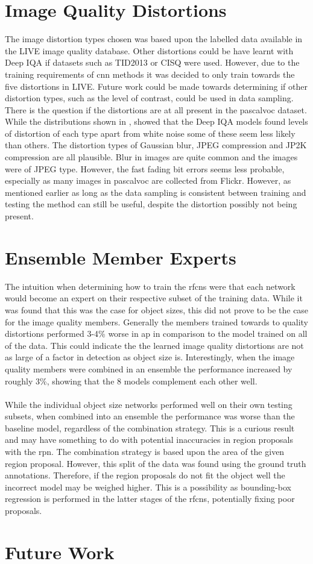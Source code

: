 \section{Image Quality Distortions}
The image distortion types chosen was based upon the labelled data available in the LIVE image quality database. Other distortions could be have learnt with Deep IQA if datasets such as TID2013 \cite{tid2013} or CISQ \cite{cisq} were used. However, due to the training requirements of \gls{cnn} methods it was decided to only train towards the five distortions in LIVE. Future work could be made towards determining if other distortion types, such as the level of contrast, could be used in data sampling. There is the question if the distortions are at all present in the \gls{pascalvoc} dataset. While the distributions shown in , showed that the Deep IQA models found levels of distortion of each type apart from white noise some of these seem less likely than others. The distortion types of Gaussian blur, JPEG compression and JP2K compression are all plausible. Blur in images are quite common and the images were of JPEG type. However, the fast fading bit errors seems less probable, especially as many images in \gls{pascalvoc} are collected from Flickr. However, as mentioned earlier as long as the data sampling is consistent between training and testing the method can still be useful, despite the distortion possibly not being present.

\section{Ensemble Member Experts}
The intuition when determining how to train the \glspl{rfcn} were that each network would become an expert on their respective subset of the training data. While it was found that this was the case for object sizes, this did not prove to be the case for the image quality members. Generally the members trained towards to quality distortions performed 3-4\% worse in \gls{ap} in comparison to the model trained on all of the data. This could indicate the the learned image quality distortions are not as large of a factor in detection as object size is. Interestingly, when the image quality members were combined in an ensemble the performance increased by roughly 3\%, showing that the 8 models complement each other well. 
\\\\
While the individual object size networks performed well on their own testing subsets, when combined into an ensemble the performance was worse than the baseline model, regardless of the combination strategy. This is a curious result and may have something to do with potential inaccuracies in region proposals with the \gls{rpn}. The combination strategy is based upon the area of the given region proposal. However, this split of the data was found using the ground truth annotations. Therefore, if the region proposals do not fit the object well the incorrect model may be weighed higher. This is a possibility as bounding-box regression is performed in the latter stages of the \glspl{rfcn}, potentially fixing poor proposals. 

\section{Future Work}